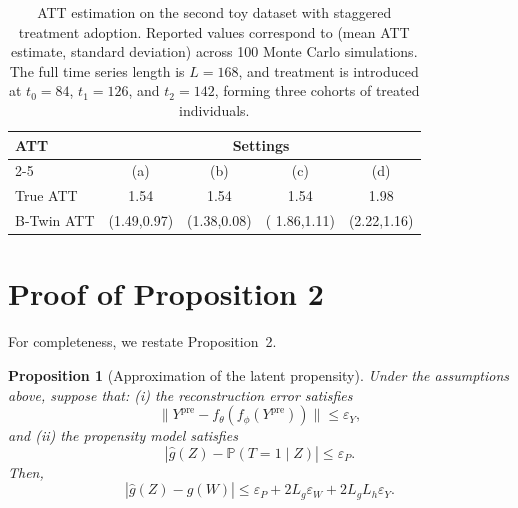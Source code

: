 \documentclass[10pt]{article} %
\newtheorem{proposition}{Proposition}
\begin{document}
\begin{table}[t]
\centering
\small
\begin{tabular}{|l|c|c|c|c|}
\hline
\textbf{ATT} 
& \multicolumn{4}{|c|}{\textbf{Settings}} \\
\cline{2-5}
& (a) &(b)& (c) & (d)  \\
\hline

True ATT 
& 1.54
&1.54 
& 1.54 
& 1.98 \\

B-Twin ATT 
& (1.49,0.97)
&(1.38,0.08)
&( 1.86,1.11)
& (2.22,1.16)\\
\hline
\end{tabular}

\caption{
ATT estimation on the second toy dataset with staggered treatment adoption.
Reported values correspond to (mean ATT estimate, standard deviation) across 100 Monte Carlo simulations.
The full time series length is $L = 168$, and treatment is introduced at
$t_0=84$, $t_1=126$, and $t_2=142$, forming three cohorts of treated individuals.
}
\label{tab:staggered_treatment_results}
\end{table}
{\section{Proof of Proposition 2}
\label{appendix:prop2_proof}
}
For completeness, we restate Proposition~2.

\begin{proposition}[Approximation of the latent propensity]
Under the assumptions above, suppose that:
(i) the reconstruction error satisfies
\[
\|Y^{\mathrm{pre}} - f_{\theta}(f_{\phi}(Y^{\mathrm{pre}}))\| \le \varepsilon_Y,
\]
and (ii) the propensity model satisfies
\[
|\hat g(Z)-\mathbb P(T=1 \mid Z)| \le \varepsilon_P.
\]
Then,
\[
|\hat g(Z)-g(W)|
\leq
\varepsilon_P
+
2L_g \varepsilon_W
+
2L_g L_h \varepsilon_Y.
\]
\end{proposition}
\end{document}
